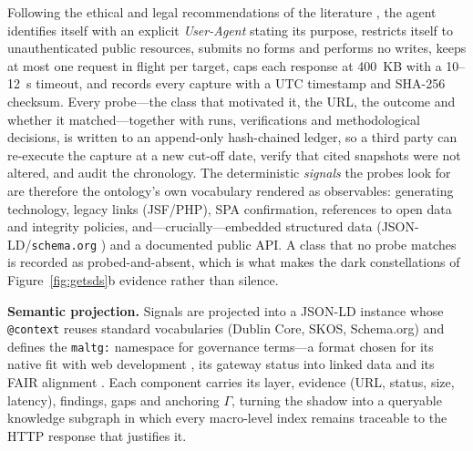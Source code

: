 \documentclass[engproc,proceedingpaper,submit,moreauthors]{Definitions/mdpi}
\begin{document}
    Following the ethical and legal recommendations of the literature \cite{Krotov2020}, the agent identifies itself with an explicit \emph{User-Agent} stating its purpose, restricts itself to unauthenticated public resources, submits no forms and performs no writes, keeps at most one request in flight per target, caps each response at 400~KB with a 10--12~s timeout, and records every capture with a UTC timestamp and SHA-256 checksum. Every probe---the class that motivated it, the URL, the outcome and whether it matched---together with runs, verifications and methodological decisions, is written to an append-only hash-chained ledger, so a third party can re-execute the capture at a new cut-off date, verify that cited snapshots were not altered, and audit the chronology. The deterministic \emph{signals} the probes look for are therefore the ontology's own vocabulary rendered as observables: generating technology, legacy links (JSF/PHP), SPA confirmation, references to open data and integrity policies, and---crucially---embedded structured data (JSON-LD/\texttt{schema.org} \cite{Guha2016}) and a documented public API. A class that no probe matches is recorded as probed-and-absent, which is what makes the dark constellations of Figure~\ref{fig:getsds}b evidence rather than silence.

    \textbf{Semantic projection.}
    Signals are projected into a JSON-LD instance whose \texttt{@context} reuses standard vocabularies (Dublin Core, SKOS, Schema.org) and defines the \texttt{maltg:} namespace for governance terms---a format chosen for its native fit with web development \cite{Guha2016}, its gateway status into linked data \cite{Bizer2009} and its FAIR alignment \cite{Wilkinson2016}. Each component carries its layer, evidence (URL, status, size, latency), findings, gaps and anchoring $\Gamma$, turning the shadow into a queryable knowledge subgraph \cite{Hogan2021} in which every macro-level index remains traceable to the HTTP response that justifies it.
\end{document}
